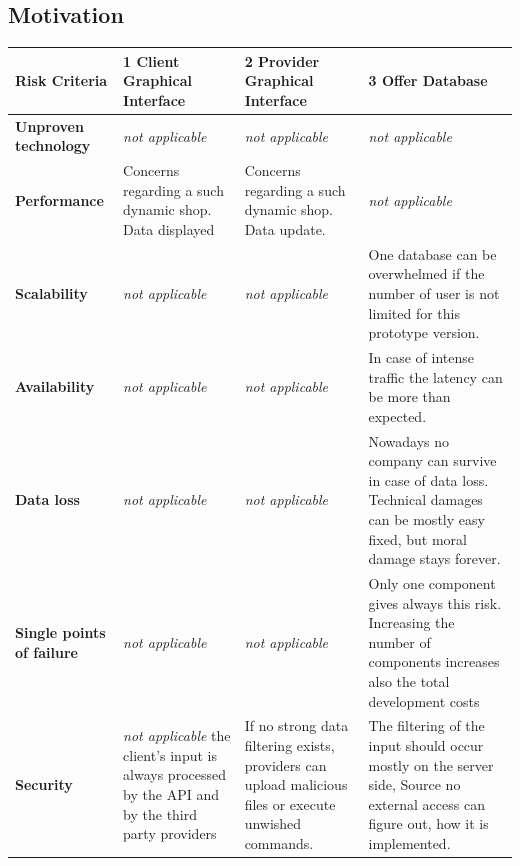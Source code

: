 \textbf{}

\subsection{Motivation}

\begin{table}[H]
        \begin{tabularx}{\textwidth}{|l|X|X|X|}
        \toprule
           \textbf{Risk Criteria} & \textbf{1 Client Graphical Interface} & \textbf{2 Provider Graphical Interface} & \textbf{3 Offer Database} \\
        \midrule
        \textbf{Unproven technology}& \textit{not applicable} & \textit{not applicable} & \textit{not applicable} \\
        \hline
        \textbf{Performance} & Concerns regarding a such dynamic shop. Data displayed & Concerns regarding a such dynamic shop. Data update. & \textit{not applicable} \\
        \hline
        \textbf{Scalability} & \textit{not applicable} & \textit{not applicable} & One database can be overwhelmed if the number of user is not limited for this prototype version. \\
        \hline
        \textbf{Availability} & \textit{not applicable} & \textit{not applicable} & In case of intense traffic the latency can be more than expected. \\
        \hline
        \textbf{Data loss} & \textit{not applicable} & \textit{not applicable} & Nowadays no company can survive in case of data loss. Technical damages can be 
        mostly easy fixed, but moral damage stays forever. \\
        \hline
        \textbf{Single points of failure} & \textit{not applicable} & \textit{not applicable} & Only one component gives always this risk. Increasing the 
        number of components increases also the total development costs \\
        \hline
        \textbf{Security} & \textit{not applicable} the client's input is always processed
        by the API and by the third party providers & If no strong data filtering exists, providers can upload
        malicious files or execute unwished commands. & The filtering of the input should occur mostly on the server side, Source
        no external access can figure out, how it is implemented. \\
        \bottomrule
    \end{tabularx}
\end{table}

